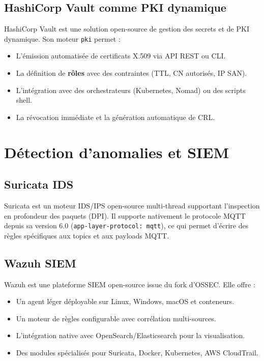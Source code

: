 \subsection{HashiCorp Vault comme PKI dynamique}

HashiCorp Vault est une solution open-source de gestion des secrets et de PKI dynamique. Son moteur \texttt{pki} permet :
\begin{itemize}
  \item L'émission automatisée de certificats X.509 via API REST ou CLI.
  \item La définition de \textbf{rôles} avec des contraintes (TTL, CN autorisés, IP SAN).
  \item L'intégration avec des orchestrateurs (Kubernetes, Nomad) ou des scripts shell.
  \item La révocation immédiate et la génération automatique de CRL.
\end{itemize}

\section{Détection d'anomalies et SIEM}

\subsection{Suricata IDS}

Suricata est un moteur IDS/IPS open-source multi-thread supportant l'inspection en profondeur des paquets (DPI). Il supporte nativement le protocole MQTT depuis sa version 6.0 (\texttt{app-layer-protocol: mqtt}), ce qui permet d'écrire des règles spécifiques aux topics et aux payloads MQTT.

\subsection{Wazuh SIEM}

Wazuh est une plateforme SIEM open-source issue du fork d'OSSEC. Elle offre :
\begin{itemize}
  \item Un agent léger déployable sur Linux, Windows, macOS et conteneurs.
  \item Un moteur de règles configurable avec corrélation multi-sources.
  \item L'intégration native avec OpenSearch/Elasticsearch pour la visualisation.
  \item Des modules spécialisés pour Suricata, Docker, Kubernetes, AWS CloudTrail.
\end{itemize}

